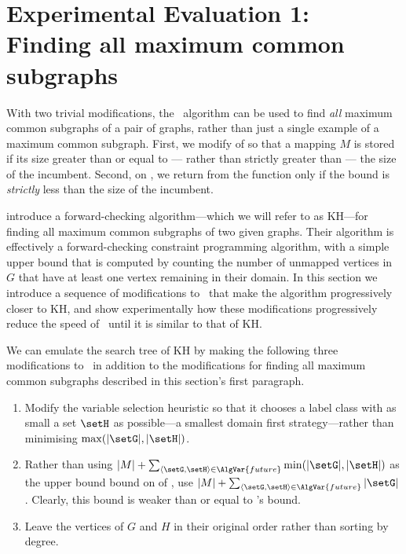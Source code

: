 \section{Experimental Evaluation 1: Finding all maximum common subgraphs}
\label{sec:mcsplit-finding-all}

With two trivial modifications, the \McSplit\ algorithm can be used to find
\emph{all} maximum common subgraphs of a pair of graphs, rather than just a single
example of a maximum common subgraph.
First, we modify  of  so that
a mapping $M$ is stored if its size greater than or equal to --- rather than
strictly greater than --- the size of the incumbent.  Second, on ,
we return from the function only if the bound is \emph{strictly} less than the
size of the incumbent.

\citet{DBLP:journals/spe/KrissinelH04} introduce a forward-checking
algorithm---which we will refer to as KH---for finding all maximum common
subgraphs of two given graphs.  Their algorithm is effectively a
forward-checking constraint programming algorithm, with a simple upper bound
that is computed by counting the number of unmapped vertices in $G$ that have
at least one vertex remaining in their domain.  In this section we
introduce a sequence of modifications to \McSplit\ that make the algorithm
progressively closer to KH, and show experimentally how these modifications
progressively reduce the speed of \McSplit\ until it is similar to that of KH.

We can emulate the search tree of KH
by making the following three modifications to \McSplit\ in addition to the modifications for
finding all maximum common subgraphs described in this section's first paragraph.

\begin{enumerate}
    \item Modify the variable selection heuristic so that it chooses a label class with
as small a set $\setH$ as possible---a smallest domain first strategy---rather than minimising $\max(|\setG|,|\setH|)$.
    \item Rather 
than using $|M|  + \sum_{\langle \setG,\setH \rangle \in \AlgVar{future}} \min(|\setG|,|\setH|)$
as the upper bound bound on  of ,
use $|M|  + \sum_{\langle \setG,\setH \rangle \in \AlgVar{future}} |\setG|$.  Clearly,
this bound is weaker than or equal to \McSplit's bound.
    \item Leave the vertices of $G$ and $H$ in their original order rather than sorting
        by degree.
\end{enumerate}

